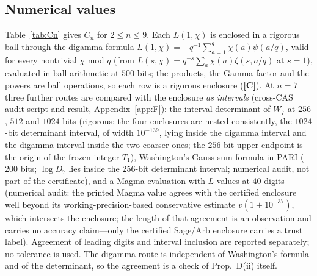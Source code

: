 \documentclass[11pt]{amsart}
\theoremstyle{remark}\newtheorem{remark}[theorem]{Remark}
\theoremstyle{definition}\newtheorem{definition}[theorem]{Definition}
\theoremstyle{definition}\newtheorem{algorithm}[theorem]{Algorithm}
\newcommand{\lbl}[1]{\textbf{[#1]}}\newcommand{\barT}{\bar T_n}
\begin{document}
\subsection{Numerical values}
Table~\ref{tab:Cn} gives $C_n$ for $2\le n\le9$. Each $L(1,\chi)$ is enclosed in a rigorous ball through the digamma formula $L(1,\chi)=-q^{-1}\sum_{a=1}^{q}\chi(a)\psi(a/q)$, valid for every nontrivial $\chi$ mod $q$ (from $L(s,\chi)=q^{-s}\sum_a\chi(a)\zeta(s,a/q)$ at $s=1$), evaluated in ball arithmetic at $500$ bits; the products, the Gamma factor and the powers are ball operations, so each row is a rigorous enclosure (\lbl{C}). At $n=7$ three further routes are compared with the enclosure \emph{as intervals} (cross-CAS audit script and result, Appendix~\ref{app:F}): the interval determinant of $W_7$ at $256$, $512$ and $1024$ bits (rigorous; the four enclosures are nested consistently, the $1024$-bit determinant interval, of width $10^{-139}$, lying inside the digamma interval and the digamma interval inside the two coarser ones; the $256$-bit upper endpoint is the origin of the frozen integer $T_1$), Washington's Gauss-sum formula in PARI ($200$ bits; $\log D_7$ lies inside the $256$-bit determinant interval; numerical audit, not part of the certificate), and a Magma evaluation with $L$-values at $40$ digits (numerical audit: the printed Magma value agrees with the certified enclosure well beyond its working-precision-based conservative estimate $v(1\pm10^{-37})$, which intersects the enclosure; the length of that agreement is an observation and carries no accuracy claim---only the certified Sage/Arb enclosure carries a trust label). Agreement of leading digits and interval inclusion are reported separately; no tolerance is used. The digamma route is independent of Washington's formula and of the determinant, so the agreement is a check of Prop.~D(ii) itself.
\end{document}

